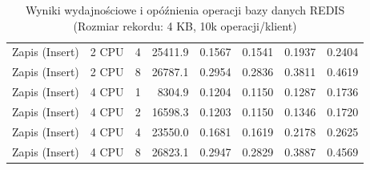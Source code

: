 \begin{table}[ht]
{\begin{tabular}{llcrrrrr}
Zapis (Insert) & 2 CPU & 4 & 25411.9 & 0.1567 & 0.1541 & 0.1937 & 0.2404 \\
Zapis (Insert) & 2 CPU & 8 & 26787.1 & 0.2954 & 0.2836 & 0.3811 & 0.4619 \\
Zapis (Insert) & 4 CPU & 1 & 8304.9 & 0.1204 & 0.1150 & 0.1287 & 0.1736 \\
Zapis (Insert) & 4 CPU & 2 & 16598.3 & 0.1203 & 0.1150 & 0.1346 & 0.1720 \\
Zapis (Insert) & 4 CPU & 4 & 23550.0 & 0.1681 & 0.1619 & 0.2178 & 0.2625 \\
Zapis (Insert) & 4 CPU & 8 & 26823.1 & 0.2947 & 0.2829 & 0.3887 & 0.4569 \\
\bottomrule
\end{tabular}%
}
\caption{Wyniki wydajnościowe i opóźnienia operacji bazy danych REDIS (Rozmiar rekordu: 4 KB, 10k operacji/klient)}
\label{tab:latency_redis_medium_10000}
\end{table}
